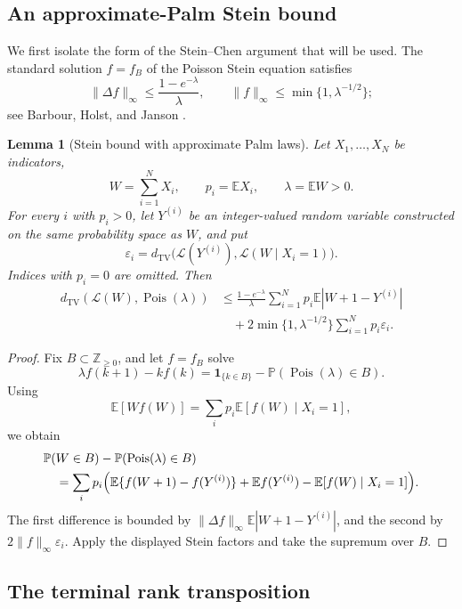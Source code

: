 \documentclass[11pt]{article}
\newtheorem{lemma}[theorem]{Lemma}
\theoremstyle{remark}
\newcommand{\Pp}{\mathbb P}
\newcommand{\Ee}{\mathbb E}
\newcommand{\one}{\mathbf 1}
\newcommand{\TV}{\mathrm{TV}}
\newcommand{\Pois}{\operatorname{Pois}}
\begin{document}
\subsection{An approximate-Palm Stein bound}

We first isolate the form of the Stein--Chen argument that will be used.  The
standard solution $f=f_B$ of the Poisson Stein equation satisfies
\[
        \|\Delta f\|_\infty\le\frac{1-e^{-\lambda}}{\lambda},
        \qquad
        \|f\|_\infty\le\min\{1,\lambda^{-1/2}\};
\]
see Barbour, Holst, and Janson \cite[Lemma I.1.1]{BHJ1992}.

\begin{lemma}[Stein bound with approximate Palm laws]\label{lem:approx-palm-stein}
Let $X_1,\ldots,X_N$ be indicators,
\[
        W=\sum_{i=1}^N X_i,
        \qquad p_i=\Ee X_i,
        \qquad \lambda=\Ee W>0.
\]
For every $i$ with $p_i>0$, let $Y^{(i)}$ be an integer-valued random variable
constructed on the same probability space as $W$, and put
\[
        \varepsilon_i=
        d_{\TV}\bigl(\mathcal L(Y^{(i)}),\mathcal L(W\mid X_i=1)\bigr).
\]
Indices with $p_i=0$ are omitted.  Then
\[
\begin{aligned}
 d_{\TV}(\mathcal L(W),\Pois(\lambda))
 &\le \frac{1-e^{-\lambda}}{\lambda}
        \sum_{i=1}^N p_i\Ee|W+1-Y^{(i)}|\\
 &\quad+2\min\{1,\lambda^{-1/2}\}
        \sum_{i=1}^N p_i\varepsilon_i.
\end{aligned}
\]
\end{lemma}

\begin{proof}
Fix $B\subset\mathbb Z_{\ge0}$, and let $f=f_B$ solve
\[
        \lambda f(k+1)-kf(k)
        =\one_{\{k\in B\}}-\Pp(\Pois(\lambda)\in B).
\]
Using
\[
        \Ee[Wf(W)]=\sum_i p_i\Ee[f(W)\mid X_i=1],
\]
we obtain
\[
\begin{aligned}
&\Pp(W\in B)-\Pp(\Pois(\lambda)\in B)\\
&\quad=\sum_i p_i\Bigl(
        \Ee\{f(W+1)-f(Y^{(i)})\}
        +\Ee f(Y^{(i)})-\Ee[f(W)\mid X_i=1]
        \Bigr).
\end{aligned}
\]
The first difference is bounded by
$\|\Delta f\|_\infty\Ee|W+1-Y^{(i)}|$, and the second by
$2\|f\|_\infty\varepsilon_i$.  Apply the displayed Stein factors and take the
supremum over $B$.
\end{proof}

\subsection{The terminal rank transposition}
\end{document}
